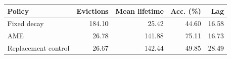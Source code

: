 \begin{center}\small\begin{tabular}{lrrrr}\toprule Policy & Evictions & Mean lifetime & Acc. (\%) & Lag\\\midrule
Fixed decay & 184.10 & 25.42 & 44.60 & 16.58\\
AME & 26.78 & 141.88 & 75.11 & 16.73\\
Replacement control & 26.67 & 142.44 & 49.85 & 28.49\\
\bottomrule\end{tabular}\end{center}